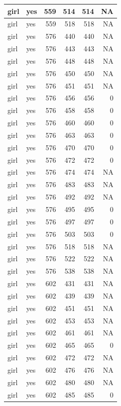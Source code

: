 \documentclass[man]{apa6}
\begin{document}
\begin{tabular}{l|l|r|r|r|r}
\hline
girl & yes & 559 & 514 & 514 & NA\\
\hline
girl & yes & 559 & 518 & 518 & NA\\
\hline
girl & yes & 576 & 440 & 440 & NA\\
\hline
girl & yes & 576 & 443 & 443 & NA\\
\hline
girl & yes & 576 & 448 & 448 & NA\\
\hline
girl & yes & 576 & 450 & 450 & NA\\
\hline
girl & yes & 576 & 451 & 451 & NA\\
\hline
girl & yes & 576 & 456 & 456 & 0\\
\hline
girl & yes & 576 & 458 & 458 & 0\\
\hline
girl & yes & 576 & 460 & 460 & 0\\
\hline
girl & yes & 576 & 463 & 463 & 0\\
\hline
girl & yes & 576 & 470 & 470 & 0\\
\hline
girl & yes & 576 & 472 & 472 & 0\\
\hline
girl & yes & 576 & 474 & 474 & NA\\
\hline
girl & yes & 576 & 483 & 483 & NA\\
\hline
girl & yes & 576 & 492 & 492 & NA\\
\hline
girl & yes & 576 & 495 & 495 & 0\\
\hline
girl & yes & 576 & 497 & 497 & 0\\
\hline
girl & yes & 576 & 503 & 503 & 0\\
\hline
girl & yes & 576 & 518 & 518 & NA\\
\hline
girl & yes & 576 & 522 & 522 & NA\\
\hline
girl & yes & 576 & 538 & 538 & NA\\
\hline
girl & yes & 602 & 431 & 431 & NA\\
\hline
girl & yes & 602 & 439 & 439 & NA\\
\hline
girl & yes & 602 & 451 & 451 & NA\\
\hline
girl & yes & 602 & 453 & 453 & NA\\
\hline
girl & yes & 602 & 461 & 461 & NA\\
\hline
girl & yes & 602 & 465 & 465 & 0\\
\hline
girl & yes & 602 & 472 & 472 & NA\\
\hline
girl & yes & 602 & 476 & 476 & NA\\
\hline
girl & yes & 602 & 480 & 480 & NA\\
\hline
girl & yes & 602 & 485 & 485 & 0\\

\end{tabular}
\end{document}
